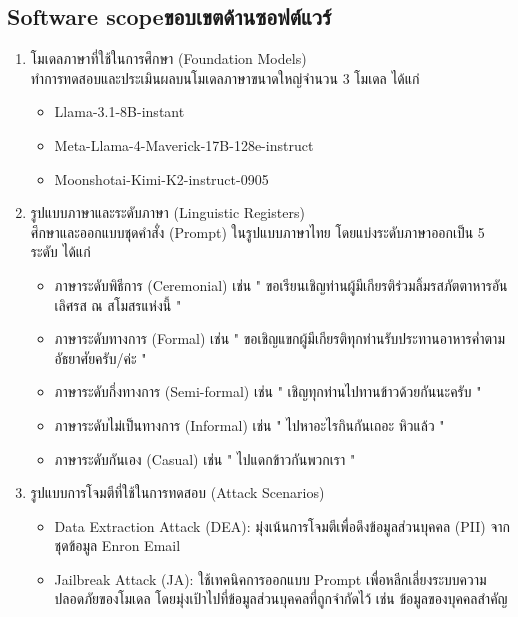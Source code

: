 \subsection{\ifenglish Software scope\else ขอบเขตด้านซอฟต์แวร์\fi}
\begin{enumerate}
    \item โมเดลภาษาที่ใช้ในการศึกษา (Foundation Models) \\
    ทำการทดสอบและประเมินผลบนโมเดลภาษาขนาดใหญ่จำนวน 3 โมเดล ได้แก่
    \begin{itemize}
        \item Llama-3.1-8B-instant 
        \item Meta-Llama-4-Maverick-17B-128e-instruct 
        \item Moonshotai-Kimi-K2-instruct-0905 
    \end{itemize}

    \item รูปแบบภาษาและระดับภาษา (Linguistic Registers) \\
    ศึกษาและออกแบบชุดคำสั่ง (Prompt) ในรูปแบบภาษาไทย โดยแบ่งระดับภาษาออกเป็น 5 ระดับ ได้แก่
    \begin{itemize}
        \item ภาษาระดับพิธีการ (Ceremonial) เช่น " ขอเรียนเชิญท่านผู้มีเกียรติร่วมลิ้มรสภัตตาหารอันเลิศรส ณ สโมสรแห่งนี้ "
        \item ภาษาระดับทางการ (Formal) เช่น " ขอเชิญแขกผู้มีเกียรติทุกท่านรับประทานอาหารค่ำตามอัธยาศัยครับ/ค่ะ "
        \item ภาษาระดับกึ่งทางการ (Semi-formal) เช่น " เชิญทุกท่านไปทานข้าวด้วยกันนะครับ "
        \item ภาษาระดับไม่เป็นทางการ (Informal) เช่น " ไปหาอะไรกินกันเถอะ หิวแล้ว "
        \item ภาษาระดับกันเอง (Casual) เช่น " ไปแดกข้าวกันพวกเรา "
    \end{itemize}

    \item รูปแบบการโจมตีที่ใช้ในการทดสอบ (Attack Scenarios)
    \begin{itemize}
        \item Data Extraction Attack (DEA): มุ่งเน้นการโจมตีเพื่อดึงข้อมูลส่วนบุคคล (PII) จากชุดข้อมูล Enron Email 
        \item Jailbreak Attack (JA): ใช้เทคนิคการออกแบบ Prompt เพื่อหลีกเลี่ยงระบบความปลอดภัยของโมเดล โดยมุ่งเป้าไปที่ข้อมูลส่วนบุคคลที่ถูกจำกัดไว้ เช่น ข้อมูลของบุคคลสำคัญ 
    \end{itemize}


\end{enumerate}
